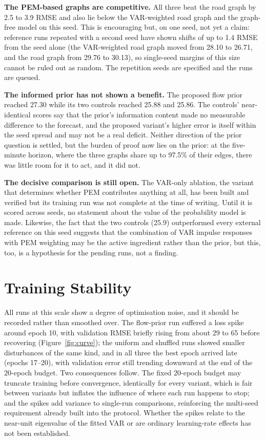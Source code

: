 \documentclass[MTech]{ugthesis}
\begin{document}
\textbf{The PEM-based graphs are competitive.} All three beat the road graph by 2.5 to 3.9 RMSE and also lie below the VAR-weighted road graph and the graph-free model on this seed. This is encouraging but, on one seed, not yet a claim: reference runs repeated with a second seed have shown shifts of up to 1.4 RMSE from the seed alone (the VAR-weighted road graph moved from 28.10 to 26.71, and the road graph from 29.76 to 30.13), so single-seed margins of this size cannot be ruled out as random. The repetition seeds are specified and the runs are queued.

\textbf{The informed prior has not shown a benefit.} The proposed flow prior reached 27.30 while its two controls reached 25.88 and 25.86. The controls' near-identical scores say that the prior's information content made no measurable difference to the forecast, and the proposed variant's higher error is itself within the seed spread and may not be a real deficit. Neither direction of the prior question is settled, but the burden of proof now lies on the prior: at the five-minute horizon, where the three graphs share up to 97.5\% of their edges, there was little room for it to act, and it did not.

\textbf{The decisive comparison is still open.} The VAR-only ablation, the variant that determines whether PEM contributes anything at all, has been built and verified but its training run was not complete at the time of writing. Until it is scored across seeds, no statement about the value of the probability model is made. Likewise, the fact that the two controls (25.9) outperformed every external reference on this seed suggests that the combination of VAR impulse responses with PEM weighting may be the active ingredient rather than the prior, but this, too, is a hypothesis for the pending runs, not a finding.

\section{Training Stability}
\label{sec:stability}
All runs at this scale show a degree of optimisation noise, and it should be recorded rather than smoothed over. The flow-prior run suffered a loss spike around epoch 10, with validation RMSE briefly rising from about 29 to 65 before recovering (Figure~\ref{fig:curve}); the uniform and shuffled runs showed smaller disturbances of the same kind, and in all three the best epoch arrived late (epochs 17--20), with validation error still trending downward at the end of the 20-epoch budget. Two consequences follow. The fixed 20-epoch budget may truncate training before convergence, identically for every variant, which is fair between variants but inflates the influence of where each run happens to stop; and the spikes add variance to single-run comparisons, reinforcing the multi-seed requirement already built into the protocol. Whether the spikes relate to the near-unit eigenvalue of the fitted VAR or are ordinary learning-rate effects has not been established.
\end{document}
